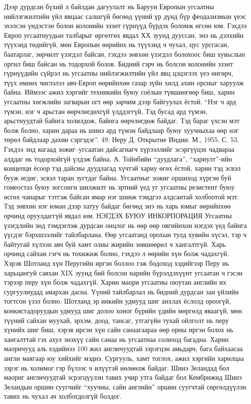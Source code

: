 Дээр дурдсан бүхий л байлдан дагуулалт нь Баруун Европын угсаатны нийлэгжилтийн үйл явцаас салшгүй бөгөөд үүний үр дүнд бүр феодализмын үеэс эхэлсэн үндэстэн болон колонийн эзэнт гүрнүүд бүрдэх боломж өгсөн юм. Гэхдээ Европ угсаатнуудын талбарыг өргөтгөх явдал ХХ зуунд дууссан, энэ нь дэлхийн түүхэнд төдийгүй, мөн Европын өөрийнх нь түүхэнд ч чухал, цус урсгасан, баатарлаг, зөрчилт үзэгдэл байсан, гэхдээ зөвхөн үзэгдэл болохоос биш хувьслын оргил биш байсан нь тодорхой болов. Бидний гэрч нь болсон колонийн эзэнт гүрнүүдийн сүйрэл нь угсаатны нийлэгжилтийн үйл явц цэцэглэх үеэ өнгөрч, түүх өмнөх чиглэлээ авч-Европ өөрийнхөө газар зүйн хилд ахин орсныг харуулж байна. Иймээс ажил хэргийг техникийн буюу соёлын түвшингөөр биш, харин угсаатны хөгжлийн загварын огт өөр зарчим дээр байгуулах ёстой. “Нэг ч ард түмэн, нэг ч арьстан өөрчлөгдөхгүй үлддэггүй, Тэд бусад ард түмэн, арьстнуудтай байнга холилдож, байнга өөрчлөгдөж байдаг. Тэд бараг үхсэн мэт болж болно, харин дараа нь шинэ ард түмэн байдлаар буюу хуучныхаа өөр нэг төрөл байдлаар дахин сэргэдэг”. 49. Неру Д. Открытие Индии. М., 1955. С. 53.
Гэхдээ энд яагаад зожиг–угсаатан дайсагнагч хүрээллийг эсэргүүцэх чадвараа алддаг нь тодорхойгүй үлдэж байна. А. Тойнбийн “дуудлага”, “хариулт”-ийн концепци ёсоор тэд дайсны дуудлагад хүчтэй хариу өгөх ёстой, харин тэд эсвэл бууж өгдөг, эсвэл таран зугтдаг байна. Угсаатныг зожиг оршиход хүргэн буй гомеостаз буюу зогсонги шилжилт нь эртний үед уг угсаатны резистент буюу өсгөх чанарыг тэтгэж байсан ямар нэг шинж тэмдгээ алдсантай холбоотой мэт. Тэд зөвхөн нэг юман дээр хатуу байдаг бөгөөд энэ нь харь юмыг өөрийнхөө орчинд оруулдаггүй явдал юм.
НЭГДЭХ БУЮУ ИНКОРПОРАЦИЯ
Угсаатны үзэгдлийн энд тэмдэглэж дурдсан онцлог нь өөр өөр овгийнхон нэгдэх үед байнга үүсдэг бэрхшээлийг тайлбарлана. Өөр угсаатанд орохын тулд хувийн хүсэл, тэр ч байтугай хүлээн авч буй хамт олны жирийн зөвшөөрөл ч хангалтгүй. Харь орчинд сайхан гэгч нь тохижиж болно, гэхдээ л өөрийн хүн болж чадахгүй. Хэрэв Шотланд хүн Перугийн иргэн боллоо гэж бодоход хэдийгээр Перу нь харьцангуй саяхан XIX зуунд бий болсон нарийн бүрэлдэхүүнт угсаатан ч гэсэн тэрээр перу хүн болж чадахгүй. Харин маори угсаатны оюутан английн их сургуулиудад амархан дасна. Үүний тайлбарлал нь бидний дурдсан зан үйлийн тогтсон үзэл болно.
Шотланд эр инкийн удмууд шиг анхлах ёслолд ороогүй, конкистадоруудын удмууд шиг долоо хоног бүрийн үдийн мөргөлд яваагүй, мөн түүний сайхан муухай, эрхэм, доод, тансаг, утгагүйн тухай ойлголт нь перу хүнийх шиг биш, хэрэв ирсэн хүн сайн санаагаараа өөр орны иргэн болох нь хангалттай гэх ахул энэхүү сайн санаа нь угсаатнаа солиход багадна. Харин маоричууд аль хэдийнээ 100 жил англичуудтай зэрэгцэн амьдарч, бага байхаасаа англи маягаар юу хийхийг мэднэ. Сургууль, хамт тоглох, ажил хэргийн харилцаа зэрэг нь холимог гэр бүлээс ч илүүтэй нөлөөлж байдаг. Шинэ Зеландад бол маориг англичуудтай эсрэгцүүлэн тавих учир утга байдаг бол Кембрижид Шинэ Зеландын оршин суугчийг “хуучны, сайн английн” оршин суугчтай сөргөлдүүлэн тавих нь чухал ач холбогдолгүй болдог.
